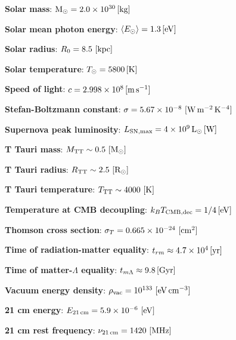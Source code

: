 \documentclass[a4paper,10pt]{article}
\begin{document}
{\noindent}\textbf{Solar mass}: ${\rm M}_\odot = 2.0\times10^{30}\,[{\rm kg}]$

{\noindent}\textbf{Solar mean photon energy}: $\langle E_\odot \rangle = 1.3\,[{\rm eV}]$

{\noindent}\textbf{Solar radius}: $R_0 = 8.5 ~ [{\rm kpc}]$

{\noindent}\textbf{Solar temperature}: $T_\odot = 5800\,[{\rm K}]$

{\noindent}\textbf{Speed of light}: $c=2.998\times10^8\,[{\rm m\,s^{-1}}]$

{\noindent}\textbf{Stefan-Boltzmann constant}: $\sigma=5.67\times10^{-8} ~ [{\rm W\,m^{-2}\,K^{-4}}]$

{\noindent}\textbf{Supernova peak luminosity}: $L_\mathrm{SN,max} = 4\times10^9\,{\rm L_\odot}\,[{\rm W}]$

{\noindent}\textbf{T Tauri mass}: $M_{\rm TT}\sim0.5 ~ [{\rm M_\odot}]$

{\noindent}\textbf{T Tauri radius}: $R_{\rm TT}\sim2.5 ~ [{\rm R_\odot}]$

{\noindent}\textbf{T Tauri temperature}: $T_{\rm TT}\sim4000 ~ [{\rm K}]$

{\noindent}\textbf{Temperature at CMB decoupling}: $k_BT_\mathrm{CMB,dec} = 1/4\,[{\rm eV}]$

{\noindent}\textbf{Thomson cross section}: $\sigma_T=0.665\times10^{-24} ~ [{\rm cm^2}]$

{\noindent}\textbf{Time of radiation-matter equality}: $t_{rm} \approx 4.7\times10^{4}\,[{\rm yr}]$

{\noindent}\textbf{Time of matter-$\Lambda$ equality}: $t_{m\Lambda}
\approx9.8\,[{\rm Gyr}]$

{\noindent}\textbf{Vacuum energy density}: $\rho_\mathrm{vac} = 10^{133} ~ [{\rm eV\,cm^{-3}}]$

{\noindent}\textbf{21 cm energy}: $E_{21\,\mathrm{cm}} = 5.9\times10^{-6} ~ [{\rm eV}]$

{\noindent}\textbf{21 cm rest frequency}: $\nu_{21\,\mathrm{cm}} = 1420 ~ [{\rm MHz}]$
\end{document}
